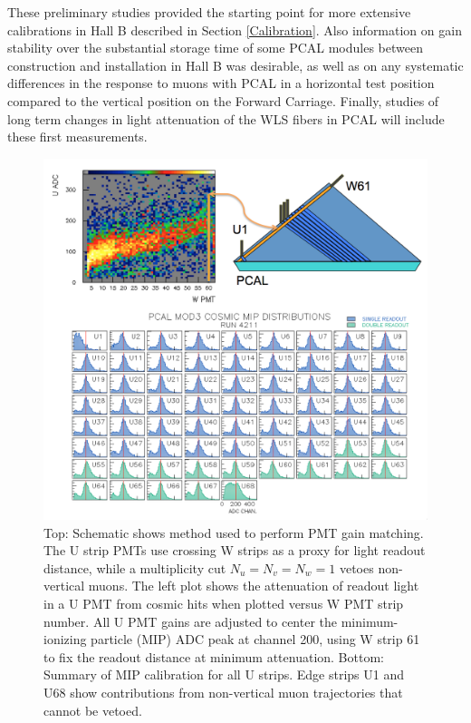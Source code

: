 These preliminary studies provided the starting point for more extensive calibrations in Hall B described in
Section \ref{Calibration}. Also information on gain stability over the substantial storage time of some PCAL
modules between construction and installation in Hall B was desirable, as well as on any systematic differences in
the response to muons with PCAL in a horizontal test position compared to the vertical position on the Forward
Carriage. Finally, studies of long term changes in light attenuation of the WLS fibers in PCAL will include these
first measurements.

\begin{figure}[hbt]
\centering
\includegraphics[width=0.95\columnwidth,keepaspectratio]{img/S5_4.png}
\caption{Top: Schematic shows method used to perform PMT gain matching. The U strip PMTs use crossing W
  strips as a proxy for light readout distance, while a multiplicity cut $N_u=N_v=N_w=1$ vetoes non-vertical muons.
  The left plot shows the attenuation of readout light in a U PMT from cosmic hits when plotted versus W PMT strip
  number. All U PMT gains are adjusted to center the minimum-ionizing particle (MIP) ADC peak at channel 200,
  using W strip 61 to fix the readout distance at minimum attenuation. Bottom: Summary of MIP calibration for all
  U strips. Edge strips U1 and U68 show contributions from non-vertical muon trajectories that cannot be vetoed.}
\label{fig:S5_4}
\end{figure}


